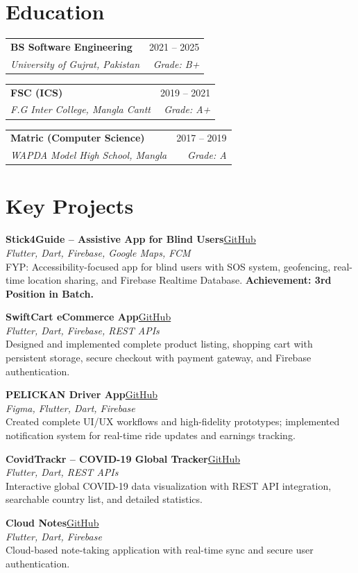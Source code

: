 \documentclass[10pt,a4paper]{article}
\makeatletter
\newcommand{\role}[4]{%
  \vspace{2pt}
  \noindent
  \begin{tabularx}{\textwidth}{@{}X r@{}}
    \textbf{#1} & \textcolor{textgray}{\footnotesize #2} \\
    \textit{\color{textgray}\footnotesize #3} & \textit{\color{textgray}\footnotesize #4} \\
  \end{tabularx}
  \vspace{2pt}
}
\newcommand{\project}[3]{%
  \vspace{4pt}
  \noindent\textbf{#1}\hfill\footnotesize\href{#2}{\color{gold}#3}\\[-1pt]
}
\makeatother
\begin{document}
\section{Education}

\role{BS Software Engineering}{2021 -- 2025}{University of Gujrat, Pakistan}{Grade: B+}
\role{FSC (ICS)}{2019 -- 2021}{F.G Inter College, Mangla Cantt}{Grade: A+}
\role{Matric (Computer Science)}{2017 -- 2019}{WAPDA Model High School, Mangla}{Grade: A}

\section{Key Projects}

\project{Stick4Guide -- Assistive App for Blind Users}{https://github.com/momina-yaqoob}{GitHub}
\footnotesize\textit{Flutter, Dart, Firebase, Google Maps, FCM}\\[-2pt]
FYP: Accessibility-focused app for blind users with SOS system, geofencing, real-time location sharing, and
Firebase Realtime Database. \textbf{Achievement: 3rd Position in Batch.}

\project{SwiftCart eCommerce App}{https://github.com/momina-yaqoob}{GitHub}
\footnotesize\textit{Flutter, Dart, Firebase, REST APIs}\\[-2pt]
Designed and implemented complete product listing, shopping cart with persistent storage, secure checkout
with payment gateway, and Firebase authentication.

\project{PELICKAN Driver App}{https://github.com/momina-yaqoob}{GitHub}
\footnotesize\textit{Figma, Flutter, Dart, Firebase}\\[-2pt]
Created complete UI/UX workflows and high-fidelity prototypes; implemented notification system for real-time
ride updates and earnings tracking.

\project{CovidTrackr -- COVID-19 Global Tracker}{https://github.com/momina-yaqoob}{GitHub}
\footnotesize\textit{Flutter, Dart, REST APIs}\\[-2pt]
Interactive global COVID-19 data visualization with REST API integration, searchable country list, and
detailed statistics.

\project{Cloud Notes}{https://github.com/momina-yaqoob}{GitHub}
\footnotesize\textit{Flutter, Dart, Firebase}\\[-2pt]
Cloud-based note-taking application with real-time sync and secure user authentication.
\end{document}
